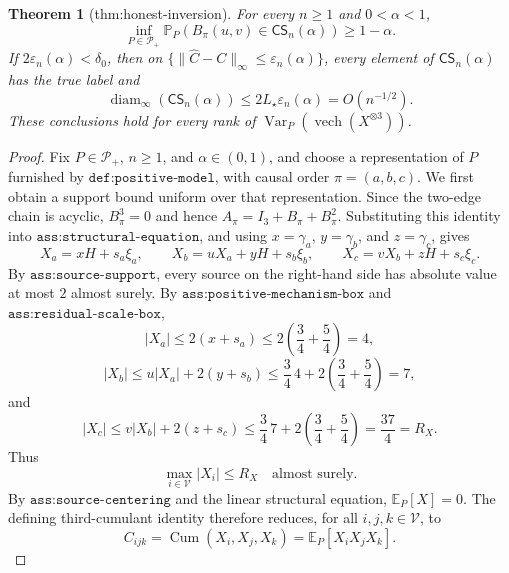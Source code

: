 \documentclass{article}
\newtheorem{theorem}{Theorem}
\begin{document}
\begin{theorem}[thm:honest-inversion]\label{thm:honest-inversion}
For every \(n\ge1\) and \(0<\alpha<1\), \[\inf_{P\in\mathcal P_+}\mathbb P_P\!\left(B_\pi(u,v)\in\mathsf{CS}_n(\alpha)\right)\ge1-\alpha.\] If \(2\varepsilon_n(\alpha)<\delta_0\), then on \(\{\|\widehat C-C\|_\infty\le\varepsilon_n(\alpha)\}\), every element of \(\mathsf{CS}_n(\alpha)\) has the true label and \[\operatorname{diam}_\infty(\mathsf{CS}_n(\alpha))\le2L_\star\varepsilon_n(\alpha)=O(n^{-1/2}).\] These conclusions hold for every rank of \(\operatorname{Var}_P(\operatorname{vech}(X^{\otimes3}))\).
\end{theorem}
\begin{proof}
Fix \(P\in\mathcal P_+\), \(n\geq1\), and \(\alpha\in(0,1)\), and choose a representation of \(P\) furnished by \(\texttt{def:positive-model}\), with causal order \(\pi=(a,b,c)\).  We first obtain a support bound uniform over that representation.  Since the two-edge chain is acyclic, \(B_\pi^3=0\) and hence \(A_\pi=I_3+B_\pi+B_\pi^2\).  Substituting this identity into \(\texttt{ass:structural-equation}\), and using \(x=\gamma_a\), \(y=\gamma_b\), and \(z=\gamma_c\), gives
\[
 X_a=xH+s_a\xi_a,
 \qquad
 X_b=uX_a+yH+s_b\xi_b,
 \qquad
 X_c=vX_b+zH+s_c\xi_c.
\]
By \(\texttt{ass:source-support}\), every source on the right-hand side has absolute value at most \(2\) almost surely.  By \(\texttt{ass:positive-mechanism-box}\) and \(\texttt{ass:residual-scale-box}\),
\[
 |X_a|
 \leq 2(x+s_a)
 \leq2\left(\frac34+\frac54\right)=4,
\]
\[
 |X_b|
 \leq u|X_a|+2(y+s_b)
 \leq\frac34\,4+2\left(\frac34+\frac54\right)=7,
\]
and
\[
 |X_c|
 \leq v|X_b|+2(z+s_c)
 \leq\frac34\,7+2\left(\frac34+\frac54\right)
 =\frac{37}{4}=R_X.
\]
Thus
\[
 \max_{i\in\mathcal V}|X_i|\leq R_X
 \quad\text{almost surely}.                                      \tag{1}
\]
By \(\texttt{ass:source-centering}\) and the linear structural equation, \(\mathbb E_P[X]=0\).  The defining third-cumulant identity therefore reduces, for all \(i,j,k\in\mathcal V\), to
\[
 C_{ijk}=\operatorname{Cum}(X_i,X_j,X_k)
 =\mathbb E_P[X_iX_jX_k].                                         \tag{2}
\]


\end{proof}
\end{document}
